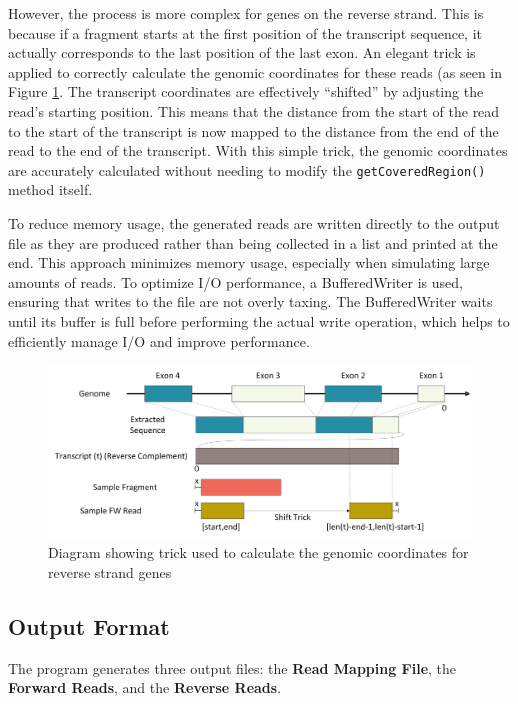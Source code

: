 \documentclass{article}
\begin{document}
    However, the process is more complex for genes on the reverse strand. This is because if a fragment starts at the first position of the transcript sequence, it actually corresponds to the last position of the last exon. An elegant trick is applied to correctly calculate the genomic coordinates for these reads (as seen in Figure \ref{fig:overlap-reverse-trick}. The transcript coordinates are effectively “shifted” by adjusting the read’s starting position. This means that the distance from the start of the read to the start of the transcript is now mapped to the distance from the end of the read to the end of the transcript. With this simple trick, the genomic coordinates are accurately calculated without needing to modify the \texttt{getCoveredRegion()} method itself.

    To reduce memory usage, the generated reads are written directly to the output file as they are produced rather than being collected in a list and printed at the end. This approach minimizes memory usage, especially when simulating large amounts of reads. To optimize I/O performance, a BufferedWriter is used, ensuring that writes to the file are not overly taxing. The BufferedWriter waits until its buffer is full before performing the actual write operation, which helps to efficiently manage I/O and improve performance.



    \begin{figure}
        \centering
        \includegraphics[width=1\textwidth]{figures/readsimulator/ReadSimulatorTrick.jpeg}
        \caption{Diagram showing trick used to calculate the genomic coordinates for reverse strand genes}
        \label{fig:overlap-reverse-trick}
    \end{figure}

    \subsection{Output Format}
    The program generates three output files: the \textbf{Read Mapping File}, the \textbf{Forward Reads}, and the \textbf{Reverse Reads}.
\end{document}
